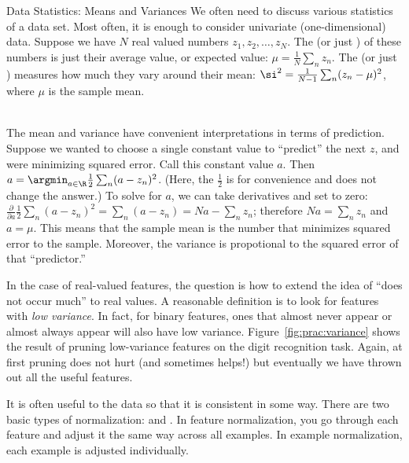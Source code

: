 \begin{mathreview}{Data Statistics: Means and Variances}
  We often need to discuss various statistics of a data set.
  Most often, it is enough to consider univariate (one-dimensional) data.
  Suppose we have $N$ real valued numbers $z_1, z_2, \dots, z_N$.
  The  (or just ) of these numbers is just their average value, or expected value: $\mu = \frac 1 N \sum_n z_n$.
  The  (or just ) measures how much they vary around their mean: $\si^2 = \frac 1 {N-1} \sum_n (z_n - \mu)^2$, where $\mu$ is the sample mean.
  
~\\

  The mean and variance have convenient interpretations in terms of prediction.
  Suppose we wanted to choose a single constant value to ``predict'' the next $z$, and were minimizing squared error.
  Call this constant value $a$.
  Then $a = \argmin_{a \in \R} \frac 1 2 \sum_n (a - z_n)^2$. 
  (Here, the $\frac 1 2$ is for convenience and does not change the answer.)
  To solve for $a$, we can take derivatives and set to zero:
    $\frac \partial {\partial a} \frac 1 2 \sum_n (a - z_n)^2
     = \sum_n (a - z_n) = N a - \sum_n z_n$; therefore $N a = \sum_n z_n$ and $a = \mu$.
  This means that the sample mean is the number that minimizes squared error to the sample.
  Moreover, the variance is propotional to the squared error of that ``predictor.''
\end{mathreview}


In the case of real-valued features, the question is how to extend the
idea of ``does not occur much'' to real values.  A reasonable
definition is to look for features with \emph{low variance}.  In fact,
for binary features, ones that almost never appear or almost always
appear will also have low variance.  Figure~\ref{fig:prac:variance}
shows the result of pruning low-variance features on the digit
recognition task.  Again, at first pruning does not hurt (and
sometimes helps!) but eventually we have thrown out all the useful
features.


It is often useful to  the data so that it is
consistent in some way.  There are two basic types of normalization:
 and .
In feature normalization, you go through each feature and adjust it
the same way across all examples.  In example normalization, each
example is adjusted individually.

